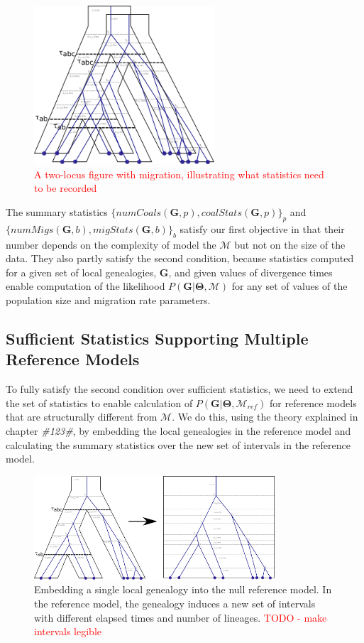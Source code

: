 \documentclass[11pt]{article}
\newcommand{\vect}[1]{\boldsymbol{\mathbf{#1}}}
\newcommand{\M}{\mathcal{M}}
\newcommand{\G}{\vect{G}}
\newcommand{\T}{\vect{\Theta}}
\newcommand{\Mref}{\M_{ref}}
\newcommand{\1}{\mathbbm{1}}
\begin{document}
\begin{figure}[h]
\centering
\includegraphics[width=0.6\textwidth]
{two_locus}
\caption{\textcolor{red}{A two-locus figure with migration, illustrating what statistics need to be recorded}}
\end{figure}


The summary statistics $\{numCoals(\G,p), coalStats(\G,p)\}_p$ and $\{numMigs(\G,b), migStats(\G,b)\}_b$ satisfy our first objective in that their number depends on the complexity of model the $\M$ but not on the size of the data.
%
They also partly satisfy the second condition, because statistics computed for a given set of local genealogies, $\G$, and given values of divergence times enable computation of the likelihood $P(\G|\T,\M)$ for any set of values of the population size and migration rate parameters.
%

\subsection{Sufficient Statistics Supporting Multiple Reference Models}
To fully satisfy the second condition over sufficient statistics,	 we need to extend the set of statistics to enable calculation of $P(\G|\T,\Mref)$ for reference models that are structurally different from $\M$.
%
We do this, using the theory explained in chapter \textit{\#123\#}, by embedding the local genealogies in the reference model and calculating the summary statistics over the new set of intervals in the reference model. 
\begin{figure}[h]
\centering
\includegraphics[width=0.8\textwidth]
{embed_in_null_model}
\caption{Embedding a single local genealogy into the null reference model. In the reference model, the genealogy induces a new set of intervals with different elapsed times and number of lineages. \textcolor{red}{TODO - make intervals legible}}
\end{figure}
\end{document}
